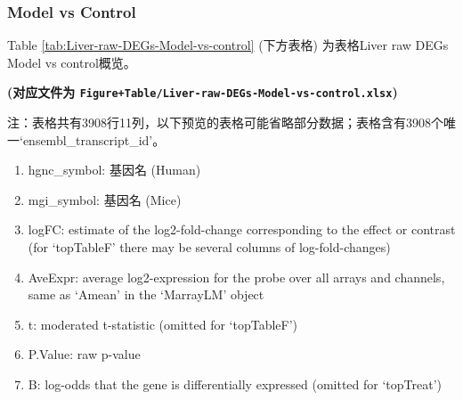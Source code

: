 \documentclass[
]{article}
\providecommand{\tightlist}{%
  \setlength{\itemsep}{0pt}\setlength{\parskip}{0pt}}
\begin{document}
\hypertarget{model-vs-control}{%
\subsubsection{Model vs Control}\label{model-vs-control}}

Table \ref{tab:Liver-raw-DEGs-Model-vs-control} (下方表格) 为表格Liver raw DEGs Model vs control概览。

\textbf{(对应文件为 \texttt{Figure+Table/Liver-raw-DEGs-Model-vs-control.xlsx})}

\begin{center}\begin{tcolorbox}[colback=gray!10, colframe=gray!50, width=0.9\linewidth, arc=1mm, boxrule=0.5pt]注：表格共有3908行11列，以下预览的表格可能省略部分数据；表格含有3908个唯一`ensembl\_transcript\_id'。
\end{tcolorbox}
\end{center}
\begin{center}\begin{tcolorbox}[colback=gray!10, colframe=gray!50, width=0.9\linewidth, arc=1mm, boxrule=0.5pt]\begin{enumerate}\tightlist
\item hgnc\_symbol:  基因名 (Human)
\item mgi\_symbol:  基因名 (Mice)
\item logFC:  estimate of the log2-fold-change corresponding to the effect or contrast (for ‘topTableF’ there may be several columns of log-fold-changes)
\item AveExpr:  average log2-expression for the probe over all arrays and channels, same as ‘Amean’ in the ‘MarrayLM’ object
\item t:  moderated t-statistic (omitted for ‘topTableF’)
\item P.Value:  raw p-value
\item B:  log-odds that the gene is differentially expressed (omitted for ‘topTreat’)
\end{enumerate}\end{tcolorbox}
\end{center}
\end{document}
